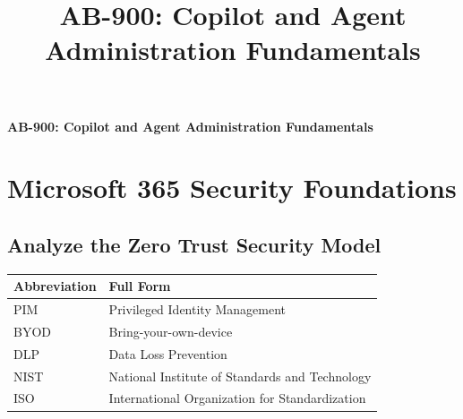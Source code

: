 \documentclass[10pt]{article}
\title{AB-900: Copilot and Agent Administration Fundamentals}
\author{}
\date{}
\begin{document}
\begin{titlepage}
\thispagestyle{empty}
\vspace*{\fill}
\begin{center}
{\LARGE\bfseries AB-900: Copilot and Agent Administration Fundamentals\par}
\end{center}
\vspace*{\fill}
\end{titlepage}
\tableofcontents
\newpage

\setcounter{section}{0}
\section{Microsoft 365 Security Foundations}
\setcounter{subsection}{0}
\clearpage
\subsection{Analyze the Zero Trust Security Model}

\begin{center}
\begin{tabular}{>{\raggedright\arraybackslash}p{} >{\raggedright\arraybackslash}p{}}
\toprule
\textbf{Abbreviation} & \textbf{Full Form} \\
\midrule
PIM & Privileged Identity Management \\
BYOD & Bring-your-own-device \\
DLP & Data Loss Prevention \\
NIST & National Institute of Standards and Technology \\
ISO & International Organization for Standardization \\
\bottomrule
\end{tabular}
\end{center}
\end{document}
